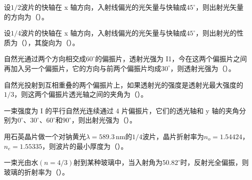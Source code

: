 \documentclass[padl, analysis, notocnum]{ExBook}
\newcommand{\answerarea}[1][3.5cm]{%
  \par\vspace{1mm}%
  \noindent{\color{themeColor!35}\rule{\linewidth}{0.4pt}}\par
  \noindent\begin{minipage}[t][#1][t]{\linewidth}\vspace{0pt}\end{minipage}\par
  \noindent{\color{themeColor!35}\rule{\linewidth}{0.4pt}}\par
}
\begin{document}
\begin{qitems}[startnum=10]
\qitem 设$1/2$波片的快轴在 x 轴方向，入射线偏光的光矢量与快轴成$45^{\circ}$，则出射光矢量的方向为（\hspace{1.6em}）。
\label{q:324:start}
\answerarea[4.0cm]
\label{q:324:end}
\end{qitems}

\begin{qitems}[startnum=11]
\qitem 设$1/4$波片的快轴在 x 轴方向，入射线偏光的光矢量与快轴成$45^{\circ}$，则出射光的性质为（\hspace{1.6em}），其旋向为（\hspace{1.6em}）。
\label{q:325:start}
\answerarea[4.0cm]
\label{q:325:end}
\end{qitems}

\begin{qitems}[startnum=12]
\qitem 自然光通过两个方向相交成$60^{\circ}$的偏振片，透射光强为 I1，今在这两个偏振片之间再加入另一个偏振片，它的方向与前两个偏振片均成$30^{\circ}$，则透射光强为（\hspace{1.6em}）。
\label{q:326:start}
\answerarea[4.0cm]
\label{q:326:end}
\end{qitems}

\begin{qitems}[startnum=13]
\qitem 自然光投射到互相重叠的两个偏振片上，如果透射光的强度是透射光最大强度的$1/3$，则这两个偏振片透光轴之间的夹角为（\hspace{1.6em}）。
\label{q:327:start}
\answerarea[4.0cm]
\label{q:327:end}
\end{qitems}

\begin{qitems}[startnum=14]
\qitem 一束强度为 I 的平行自然光连续通过 4 片偏振片，它们的透光轴和 y 轴的夹角分别为$0^{\circ}$、$30^{\circ}$、$60^{\circ}$和$90^{\circ}$，则出射光强为（\hspace{1.6em}）。
\label{q:328:start}
\answerarea[4.0cm]
\label{q:328:end}
\end{qitems}

\begin{qitems}[startnum=15]
\qitem 用石英晶片做一个对钠黄光$\lambda =589.3\,\mathrm{nm}$的$1/4$波片，晶片折射率为$n_{o}=1.54424$，$n_{e}=1.55335$，则波片的最小厚度为（\hspace{1.6em}）。
\label{q:329:start}
\answerarea[4.0cm]
\label{q:329:end}
\end{qitems}

\begin{qitems}[startnum=16]
\qitem 一束光由水$(n=4/3)$射到某种玻璃中，当入射角为$50.82^{\circ}$时，反射光全偏振，则玻璃的折射率为（\hspace{1.6em}）。
\label{q:330:start}
\answerarea[4.0cm]
\label{q:330:end}
\end{qitems}
\end{document}
